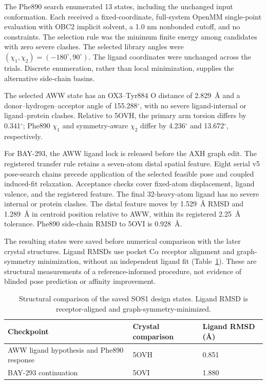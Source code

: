 The Phe890 search enumerated 13 states, including the unchanged input conformation. Each received a fixed-coordinate, full-system OpenMM single-point evaluation with OBC2 implicit solvent, a 1.0 nm nonbonded cutoff, and no constraints. The selection rule was the minimum finite energy among candidates with zero severe clashes. The selected library angles were $(\chi_1,\chi_2)=(-180^{\circ},90^{\circ})$. The ligand coordinates were unchanged across the trials. Discrete enumeration, rather than local minimization, supplies the alternative side-chain basins.

The selected AWW state has an OX3--Tyr884 O distance of 2.829~\AA{} and a donor--hydrogen--acceptor angle of 155.288$^{\circ}$, with no severe ligand-internal or ligand--protein clashes. Relative to 5OVH, the primary arm torsion differs by 0.341$^{\circ}$; Phe890 $\chi_1$ and symmetry-aware $\chi_2$ differ by 4.236$^{\circ}$ and 13.672$^{\circ}$, respectively.

For BAY-293, the AWW ligand lock is released before the AXH graph edit. The registered transfer rule retains a seven-atom distal spatial feature. Eight serial v5 pose-search chains precede application of the selected feasible pose and coupled induced-fit relaxation. Acceptance checks cover fixed-atom displacement, ligand valence, and the registered feature. The final 32-heavy-atom ligand has no severe internal or protein clashes. The distal feature moves by 1.529~\AA{} RMSD and 1.289~\AA{} in centroid position relative to AWW, within its registered 2.25~\AA{} tolerance. Phe890 side-chain RMSD to 5OVI is 0.928~\AA{}.

The resulting states were saved before numerical comparison with the later crystal structures. Ligand RMSDs use pocket C$\alpha$ receptor alignment and graph-symmetry minimization, without an independent ligand fit (Table~\ref{tab:appA_sos1_eval}). These are structural measurements of a reference-informed procedure, not evidence of blinded pose prediction or affinity improvement.

\begin{table}[htbp]
\centering\small
\caption{Structural comparison of the saved SOS1 design states. Ligand RMSD is receptor-aligned and graph-symmetry-minimized.}
\label{tab:appA_sos1_eval}
\begin{tabular}{@{}lll@{}}
\toprule
\textbf{Checkpoint} & \textbf{Crystal comparison} & \textbf{Ligand RMSD (\AA{})}\\
\midrule
AWW ligand hypothesis and Phe890 response & 5OVH & 0.851\\
BAY-293 continuation & 5OVI & 1.880\\
\bottomrule
\end{tabular}
\end{table}


